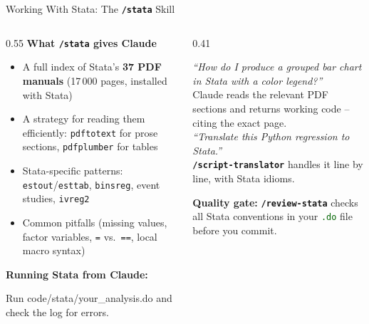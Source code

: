 \documentclass[aspectratio=169,11pt,dvipsnames]{beamer}
\newcommand{\skill}[1]{\texttt{\textcolor{defaultclr}{\textbf{/#1}}}}
\newcommand{\file}[1]{\textcolor{darkgreen}{\nolinkurl{#1}}}
\begin{document}
\begin{frame}[fragile]{Working With Stata: The \skill{stata} Skill}
  \begin{columns}[T]
    \begin{column}{0.55\textwidth}
      \textbf{What \skill{stata} gives Claude}
      \begin{itemize}\setlength\itemsep{4pt}
        \item A full index of Stata's \textbf{37 PDF manuals}
          (17\,000 pages, installed with Stata)
        \item A strategy for reading them efficiently:
          \texttt{pdftotext} for prose sections,
          \texttt{pdfplumber} for tables
        \item Stata-specific patterns: \texttt{estout}/\texttt{esttab},
          \texttt{binsreg}, event studies, \texttt{ivreg2}
        \item Common pitfalls (missing values, factor variables,
          \texttt{=} vs.\ \texttt{==}, local macro syntax)
      \end{itemize}
      \vspace{0.2cm}
      \textbf{Running Stata from Claude:}
      \begin{codebox}
Run code/stata/your_analysis.do
and check the log for errors.
      \end{codebox}
    \end{column}
    \begin{column}{0.41\textwidth}
      \begin{greenbox}[title=Example interactions]
        \small
        \textit{``How do I produce a grouped bar chart in Stata
        with a color legend?''}\\[0.2cm]
        Claude reads the relevant PDF sections and returns
        working code -- citing the exact page.\\[0.3cm]
        \textit{``Translate this Python regression to Stata.''}\\[0.2cm]
        \skill{script-translator} handles it line by line,
        with Stata idioms.
      \end{greenbox}
      \vspace{0.2cm}
      \small \textbf{Quality gate:} \skill{review-stata} checks all
      Stata conventions in your \file{.do} file before you commit.
    \end{column}
  \end{columns}
\end{frame}
\end{document}
